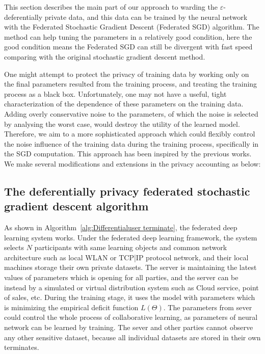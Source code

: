 \documentclass[journal,transmag]{IEEEtran}
\begin{document}
This section describes the main part of our approach to warding the $\varepsilon$-deferentially private data, and this data can be trained by the neural network with the Federated Stochastic Gradient Descent (Federated SGD) algorithm. The method can help tuning the parameters in a relatively good condition, here the good condition means the Federated SGD can still be divergent with fast speed comparing with the original stochastic gradient descent method.

One might attempt to protect the privacy of training data by working only on the final parameters resulted from the training process, and treating the training process as a black box. Unfortunately, one may not have a useful, tight characterization of the dependence of these parameters on the training data. Adding overly conservative noise to the parameters, of which the noise is selected by analysing the worst case, would destroy the utility of the learned model. Therefore, we aim to a more sophisticated approach which could flexibly control the noise influence of the training data during the training process, specifically in the SGD computation. This approach has been inspired by the previous works\cite{shokri2015privacy}. We make several modifications and extensions in the privacy accounting as below:

\subsection{The deferentially privacy federated stochastic gradient descent algorithm}

As shown in Algorithm~\ref{alg:Differentialuser terminate}, the federated deep learning system works. Under the federated deep learning framework, the system selects $N$ participants with same learning objects and common network architecture such as local WLAN or TCP|IP protocol network, and their local machines storage their own private datasets. The server is maintaining the latest values of parameters which is opening for all parties, and the server can be instead by a simulated or virtual distribution system such as Cloud service, point of sales, etc. During the training stage, it uses the model with parameters which is minimizing the empirical deficit function $L(\Theta)$. The parameters from sever could control the whole process of collaborative learning, as parameters of neural network can be learned by training. The sever and other parties cannot observe any other sensitive dataset, because all individual datasets are stored in their own terminates. 
\end{document}
